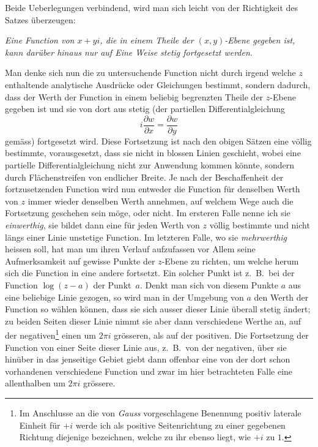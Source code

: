 \documentclass[a4paper,12pt,leqno]{article}
\begin{document}
Beide Ueberlegungen verbindend, wird man sich leicht von der
Richtigkeit des Satzes \"{u}berzeugen:

{\itshape
Eine Function von $x + yi$, die in einem Theile der
$(x, y)$-Ebene gegeben ist, kann dar\"{u}ber hinaus nur auf Eine
Weise stetig fortgesetzt werden.}

Man denke sich nun die zu untersuchende Function nicht durch
irgend welche $z$ enthaltende analytische Ausdr\"{u}cke oder
Gleichungen bestimmt, sondern dadurch, dass der Werth der
Function in einem beliebig begrenzten Theile der $z$-Ebene
gegeben ist und sie von dort aus stetig (der partiellen
Differentialgleichung
\[ i \frac{\partial w}{\partial x}
   = \frac{\partial w}{\partial y} \]
gem\"{a}ss) fortgesetzt wird.  Diese Fortsetzung ist nach den
obigen S\"{a}tzen eine v\"{o}llig bestimmte, vorausgesetzt, dass
sie nicht in blossen Linien geschieht, wobei eine partielle
Differentialgleichung nicht zur Anwendung kommen k\"{o}nnte,
sondern durch Fl\"{a}chenstreifen von endlicher Breite.  Je
nach der Beschaffenheit der fortzusetzenden Function wird nun
entweder die Function f\"{u}r denselben Werth von $z$ immer
wieder denselben Werth annehmen, auf welchem Wege auch die
Fortsetzung geschehen sein m\"{o}ge, oder nicht.  Im ersteren
Falle nenne ich sie \emph{einwerthig}, sie bildet dann eine
f\"{u}r jeden Werth von $z$ v\"{o}llig bestimmte und nicht
l\"{a}ngs einer Linie unstetige Function.  Im letzteren Falle, wo
sie \emph{mehrwerthig} heissen soll, hat man um ihren Verlauf
aufzufassen vor Allem seine Aufmerksamkeit auf gewisse Punkte
der $z$-Ebene zu richten, um welche herum sich die Function in
eine andere fortsetzt.  Ein solcher Punkt ist z.~B.\ bei der
Function $\log (z - a)$ der Punkt~$a$.  Denkt man sich von diesem
Punkte $a$ aus eine beliebige Linie gezogen, so wird man in der
Umgebung von $a$ den Werth der Function so w\"{a}hlen k\"{o}nnen,
dass sie sich ausser dieser Linie \"{u}berall stetig \"{a}ndert;
zu beiden Seiten dieser Linie nimmt sie aber dann verschiedene
Werthe an, auf der negativen\footnote{\label{`positiv'}Im
Anschlusse an die von \emph{Gauss} vorgeschlagene Benennung
positiv laterale Einheit f\"{u}r $+i$ werde ich als positive
Seitenrichtung zu einer gegebenen Richtung diejenige bezeichnen,
welche zu ihr ebenso liegt, wie $+i$ zu $1$.}
einen um $2\pi i$ gr\"{o}sseren, als auf der positiven.  Die
Fortsetzung der Function von einer Seite dieser Linie aus,
z.~B.\ von der negativen, \"{u}ber sie hin\"{u}ber in das
jenseitige Gebiet giebt dann offenbar eine von der dort schon
vorhandenen verschiedene Function und zwar im hier betrachteten
Falle eine allenthalben um $2\pi i$ gr\"{o}ssere.
\end{document}
